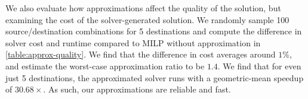 We also evaluate how approximations affect the quality of the solution, but examining the cost of the solver-generated solution. We randomly sample 100 source/destination combinations for 5 destinations and compute the difference in solver cost and runtime compared to MILP without approximation in \cref{table:approx-quality}. We find that the difference in cost averages around $1\%$, and estimate the worst-case approximation ratio to be $1.4$. We find that for even just 5 destinations, the approximated solver runs with a geometric-mean speedup of $30.68\times$. As such, our approximations are reliable and fast.


